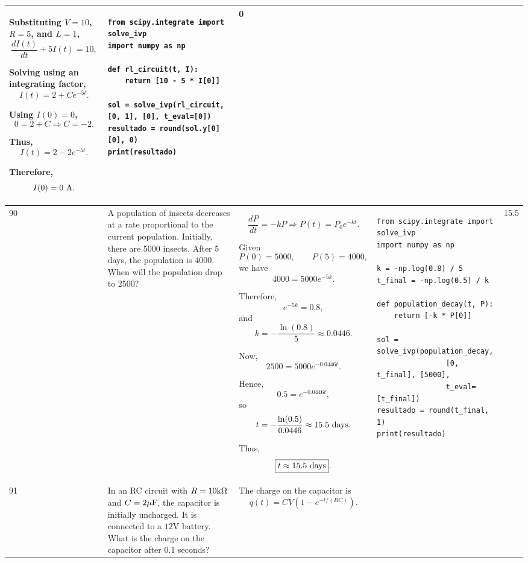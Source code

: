 \documentclass[a4paper,12pt]{article}
\begin{document}
\begin{longtable}{|p{0.3cm}|p{}|p{10cm}|p{}|p{1.5cm}|}
Substituting $V=10$, $R=5$, and $L=1$,
\[
\frac{dI(t)}{dt}+5I(t)=10,
\]

Solving using an integrating factor,
\[
I(t)=2+Ce^{-5t}.
\]

Using $I(0)=0$,
\[
0=2+C
\Rightarrow C=-2.
\]

Thus,
\[
I(t)=2-2e^{-5t}.
\]

Therefore,
\[
I(0)=0\ {\rm A}.
\]
&
\begin{verbatim}
from scipy.integrate import solve_ivp
import numpy as np

def rl_circuit(t, I):
    return [10 - 5 * I[0]]

sol = solve_ivp(rl_circuit, [0, 1], [0], t_eval=[0])
resultado = round(sol.y[0][0], 0)
print(resultado)
\end{verbatim}
&
0 \\
\hline

90 &
A population of insects decreases at a rate proportional to the current population. Initially, there are 5000 insects. After 5 days, the population is 4000. When will the population drop to 2500? &
\[
\frac{dP}{dt}=-kP
\Rightarrow
P(t)=P_0e^{-kt}.
\]

Given
\[
P(0)=5000,\qquad P(5)=4000,
\]
we have
\[
4000=5000e^{-5k}.
\]

Therefore,
\[
e^{-5k}=0.8,
\]
and
\[
k=-\frac{\ln(0.8)}{5}
\approx0.0446.
\]

Now,
\[
2500=5000e^{-0.0446t}.
\]

Hence,
\[
0.5=e^{-0.0446t},
\]
so
\[
t=-\frac{\ln(0.5)}{0.0446}
\approx15.5\ {\rm days}.
\]

Thus,
\[
\boxed{t\approx15.5\ {\rm days}}.
\]
&
\begin{verbatim}
from scipy.integrate import solve_ivp
import numpy as np

k = -np.log(0.8) / 5
t_final = -np.log(0.5) / k

def population_decay(t, P):
    return [-k * P[0]]

sol = solve_ivp(population_decay,
                [0, t_final], [5000],
                t_eval=[t_final])
resultado = round(t_final, 1)
print(resultado)
\end{verbatim}
&
15.5 \\
\hline

91 &
In an RC circuit with $R=10{\rm k}\Omega$ and $C=2\mu{\rm F}$, the capacitor is initially uncharged. It is connected to a $12$V battery. What is the charge on the capacitor after $0.1$ seconds? &
The charge on the capacitor is
\[
q(t)=CV\left(1-e^{-t/(RC)}\right).
\]


\end{longtable}
\end{document}
